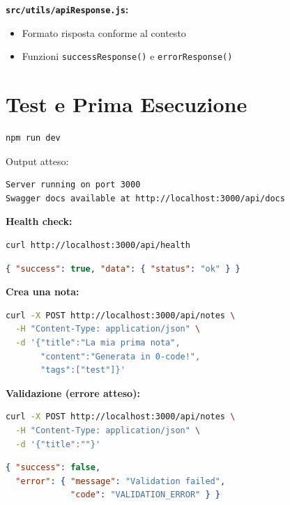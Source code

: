 \textbf{\texttt{src/utils/apiResponse.js}:}
\begin{itemize}
  \item Formato risposta conforme al contesto
  \item Funzioni \texttt{successResponse()} e \texttt{errorResponse()}
\end{itemize}

\section{Test e Prima Esecuzione}

\begin{praticabox}[title={Pratica --- Avvio del server}]
\begin{lstlisting}[language=bash]
npm run dev
\end{lstlisting}
Output atteso:
\begin{lstlisting}[language={}]
Server running on port 3000
Swagger docs available at http://localhost:3000/api/docs
\end{lstlisting}
\end{praticabox}

\begin{praticabox}[title={Pratica --- Test manuali}]
\textbf{Health check:}
\begin{lstlisting}[language=bash]
curl http://localhost:3000/api/health
\end{lstlisting}
\begin{lstlisting}[language=json]
{ "success": true, "data": { "status": "ok" } }
\end{lstlisting}

\textbf{Crea una nota:}
\begin{lstlisting}[language=bash]
curl -X POST http://localhost:3000/api/notes \
  -H "Content-Type: application/json" \
  -d '{"title":"La mia prima nota",
       "content":"Generata in 0-code!",
       "tags":["test"]}'
\end{lstlisting}

\textbf{Validazione (errore atteso):}
\begin{lstlisting}[language=bash]
curl -X POST http://localhost:3000/api/notes \
  -H "Content-Type: application/json" \
  -d '{"title":""}'
\end{lstlisting}
\begin{lstlisting}[language=json]
{ "success": false,
  "error": { "message": "Validation failed",
             "code": "VALIDATION_ERROR" } }
\end{lstlisting}
\end{praticabox}

